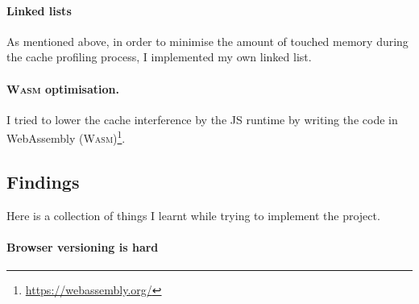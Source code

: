 \documentclass[a4paper,10pt,twocolumn]{article}
\theoremstyle{definition}
\newcommand*{\code}{\texttt}
\newcommand*{\acronym}{\textsc}
\newcommand*{\WASM}{\acronym{Wasm}}
\begin{document}
\paragraph{Linked lists}
As mentioned above, in order to minimise the amount of touched memory during the
cache profiling process, I implemented my own linked list.

\paragraph{\WASM{} optimisation.}
I tried to lower the cache interference by the JS runtime by writing the code in
WebAssembly (\WASM{})\footnote{\url{https://webassembly.org/}}.


% 

\subsection{Findings}
Here is a collection of things I learnt while trying to implement the project.

\paragraph{Browser versioning is hard}
\end{document}
